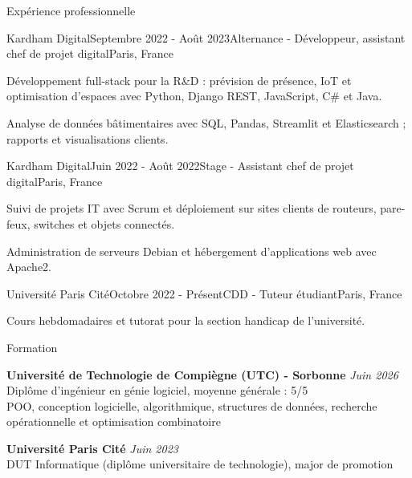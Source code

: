 \documentclass[
    10pt,
]{style} %
\begin{document}
\begin{rSection}{Expérience professionnelle}

        \begin{rSubsection}{Kardham Digital}{Septembre 2022 - Août 2023}{Alternance - Développeur, assistant chef de projet digital}{Paris, France}
            \item Développement full-stack pour la R\&D : prévision de présence, IoT et optimisation d’espaces avec Python, Django REST, JavaScript, C\# et Java.
            \item Analyse de données bâtimentaires avec SQL, Pandas, Streamlit et Elasticsearch ; rapports et visualisations clients.
        \end{rSubsection}


        \begin{rSubsection}{Kardham Digital}{Juin 2022 - Août 2022}{Stage - Assistant chef de projet digital}{Paris, France}
            \item Suivi de projets IT avec Scrum et déploiement sur sites clients de routeurs, pare-feux, switches et objets connectés.
            \item Administration de serveurs Debian et hébergement d’applications web avec Apache2.
        \end{rSubsection}


        \begin{rSubsection}{Université Paris Cité}{Octobre 2022 - Présent}{CDD - Tuteur étudiant}{Paris, France}
            \item Cours hebdomadaires et tutorat pour la section handicap de l’université.
        \end{rSubsection}

    \end{rSection}


    \begin{rSection}{Formation}

        \textbf{Université de Technologie de Compiègne (UTC) - Sorbonne} \hfill \textit{Juin 2026} \\
        Diplôme d’ingénieur en génie logiciel, moyenne générale : 5/5 \\
        POO, conception logicielle, algorithmique, structures de données, recherche opérationnelle et optimisation combinatoire

        \textbf{Université Paris Cité} \hfill \textit{Juin 2023} \\
        DUT Informatique (diplôme universitaire de technologie), major de promotion

    \end{rSection}
\end{document}
